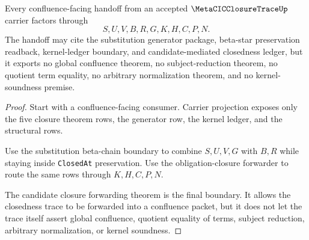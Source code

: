 \begin{theorem}
\label{thm:metacicclosuretrace-confluence-handoff-boundary}
Every confluence-facing handoff from an accepted $\MetaCICClosureTraceUp$ carrier factors through
$$
S,U,V,B,R,G,K,H,C,P,N .
$$
The handoff may cite the substitution generator package, beta-star preservation readback, kernel-ledger boundary, and candidate-mediated closedness ledger, but it exports no global confluence theorem, no subject-reduction theorem, no quotient term equality, no arbitrary normalization theorem, and no kernel-soundness premise.
\end{theorem}
\begin{proof}
Start with a confluence-facing consumer. Carrier projection exposes only the five closure theorem rows, the generator row, the kernel ledger, and the structural rows.

Use the substitution beta-chain boundary to combine $S,U,V,G$ with $B,R$ while staying inside \texttt{ClosedAt} preservation. Use the obligation-closure forwarder to route the same rows through $K,H,C,P,N$.

The candidate closure forwarding theorem is the final boundary. It allows the closedness trace to be forwarded into a confluence packet, but it does not let the trace itself assert global confluence, quotient equality of terms, subject reduction, arbitrary normalization, or kernel soundness.
\end{proof}

